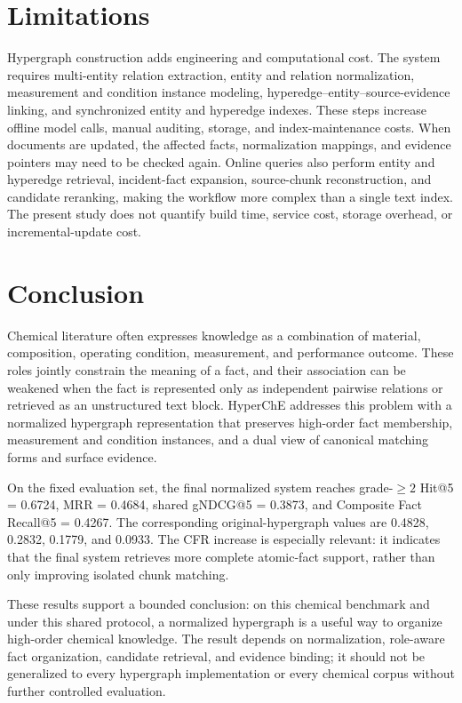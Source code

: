 \section{Limitations}

Hypergraph construction adds engineering and computational cost. The system requires multi-entity relation extraction, entity and relation normalization, measurement and condition instance modeling, hyperedge--entity--source-evidence linking, and synchronized entity and hyperedge indexes. These steps increase offline model calls, manual auditing, storage, and index-maintenance costs. When documents are updated, the affected facts, normalization mappings, and evidence pointers may need to be checked again. Online queries also perform entity and hyperedge retrieval, incident-fact expansion, source-chunk reconstruction, and candidate reranking, making the workflow more complex than a single text index. The present study does not quantify build time, service cost, storage overhead, or incremental-update cost.

\section{Conclusion}

Chemical literature often expresses knowledge as a combination of material, composition, operating condition, measurement, and performance outcome. These roles jointly constrain the meaning of a fact, and their association can be weakened when the fact is represented only as independent pairwise relations or retrieved as an unstructured text block. HyperChE addresses this problem with a normalized hypergraph representation that preserves high-order fact membership, measurement and condition instances, and a dual view of canonical matching forms and surface evidence.

On the fixed evaluation set, the final normalized system reaches grade-$\geq 2$ Hit@5 = 0.6724, MRR = 0.4684, shared gNDCG@5 = 0.3873, and Composite Fact Recall@5 = 0.4267. The corresponding original-hypergraph values are 0.4828, 0.2832, 0.1779, and 0.0933. The CFR increase is especially relevant: it indicates that the final system retrieves more complete atomic-fact support, rather than only improving isolated chunk matching.

These results support a bounded conclusion: on this chemical benchmark and under this shared protocol, a normalized hypergraph is a useful way to organize high-order chemical knowledge. The result depends on normalization, role-aware fact organization, candidate retrieval, and evidence binding; it should not be generalized to every hypergraph implementation or every chemical corpus without further controlled evaluation.

